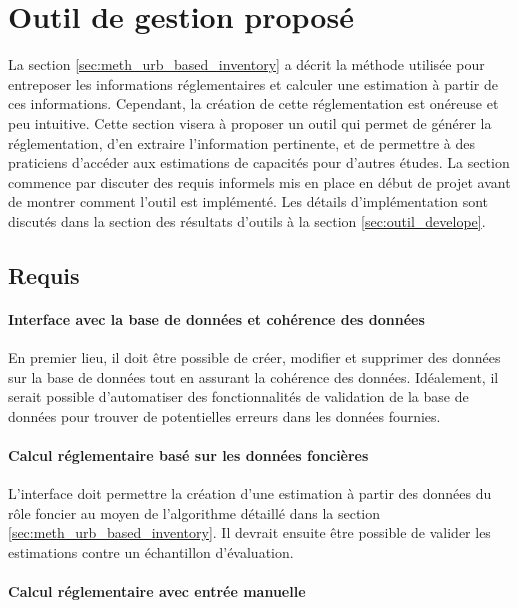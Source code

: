 \section{Outil de gestion proposé}\label{sec:meth_tool}
La section \ref{sec:meth_urb_based_inventory} a décrit la méthode utilisée pour entreposer les informations réglementaires et calculer une estimation à partir de ces informations. Cependant, la création de cette réglementation est onéreuse et peu intuitive. Cette section visera à proposer un outil qui permet de générer la réglementation, d'en extraire l'information pertinente, et de permettre à des praticiens d'accéder aux estimations de capacités pour d'autres études. La section  commence par discuter des requis informels mis en place en début de projet avant de montrer comment l'outil est implémenté.
Les détails d'implémentation sont discutés dans la section des résultats d'outils à la section \ref{sec:outil_develope}.
\subsection{Requis}

\paragraph{Interface avec la base de données et cohérence des données}

En premier lieu, il doit être possible de créer, modifier et supprimer des données sur la base de données tout en assurant la cohérence des données. Idéalement, il serait possible d'automatiser des fonctionnalités de validation de la base de données pour trouver de potentielles erreurs dans les données fournies.

\paragraph{Calcul réglementaire basé sur les données foncières}

L'interface doit permettre la création d'une estimation à partir des données du rôle foncier au moyen  de l'algorithme détaillé dans la section \ref{sec:meth_urb_based_inventory}. Il devrait ensuite être possible de valider les estimations contre un échantillon d'évaluation.

\paragraph{Calcul réglementaire avec entrée manuelle}

